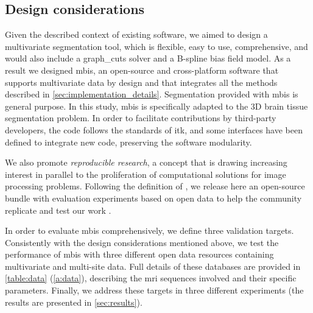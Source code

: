 \subsection{Design considerations}\label{sec:design}
Given the described context of existing software, we aimed to design a
  multivariate segmentation tool, which is flexible, easy to use, comprehensive,
  and would also include a \gls*{graph_cuts} solver and a B-spline bias field model.
As a result we designed \gls*{mbis}, an open-source and cross-platform software that
  supports multivariate data by design and that integrates all the methods described in
  \autoref{sec:implementation_details}.
Segmentation provided with \gls*{mbis} is general purpose.
In this study, \gls*{mbis} is specifically adapted to the 3D
  brain tissue segmentation problem.
In order to facilitate contributions by third-party developers, the code
  follows the standards of \gls*{itk}, and some interfaces have been defined
  to integrate new code, preserving the software modularity.

We also promote \emph{reproducible research}, a concept that is drawing increasing
  interest in parallel to the proliferation of computational solutions
  for image processing problems.
Following the definition of \citeauthor{vandewalle_reproducible_2009}
  \citep{vandewalle_reproducible_2009}, we release here an
  open-source bundle with evaluation experiments based on open data
  to help the community replicate and test our work \citep{yoo_open_2005,
  ibanez_open_2006}.
  
In order to evaluate \gls*{mbis} comprehensively, we define three
  validation targets.
Consistently with the design considerations mentioned above,
  we test the performance of \gls*{mbis} with three different
  open data resources containing multivariate and multi-site
  data.
Full details of these databases are provided in \autoref{table:data} 
  (\ref{a:data}), describing the \gls*{mri} sequences involved and
  their specific parameters.
Finally, we address these targets in three different experiments
  (the results are presented in \autoref{sec:results}).

